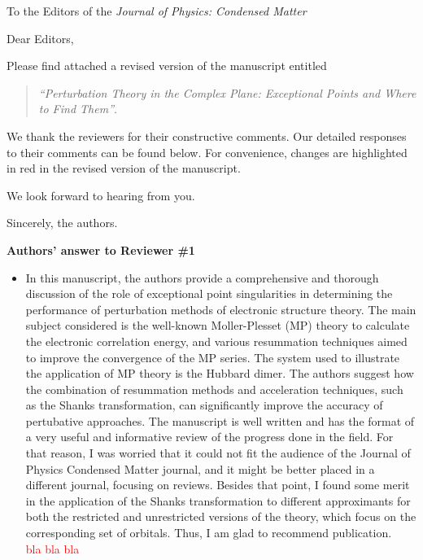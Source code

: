 \documentclass[10pt]{letter}
\newcommand{\alert}[1]{\textcolor{red}{#1}}
\begin{document}
\begin{letter}%
{To the Editors of the \textit{Journal of Physics: Condensed Matter}}

\opening{Dear Editors,}

\justifying
Please find attached a revised version of the manuscript entitled 
\begin{quote}
	\textit{``Perturbation Theory in the Complex Plane: Exceptional Points and Where to Find Them''}.
\end{quote}
We thank the reviewers for their constructive comments.
Our detailed responses to their comments can be found below.
For convenience, changes are highlighted in red in the revised version of the manuscript. 

We look forward to hearing from you.

\closing{Sincerely, the authors.}

\noindent \textbf{\large Authors' answer to Reviewer \#1}

\begin{itemize}

	\item 
	{In this manuscript, the authors provide a comprehensive and thorough discussion of the role of exceptional point singularities in determining the performance of perturbation methods of electronic structure theory. The main subject  considered is the well-known Moller-Plesset (MP) theory to calculate the electronic correlation energy, and various resummation techniques aimed to improve the convergence of the MP series. The system used to illustrate the application of MP theory is the Hubbard dimer. The authors suggest how the combination of resummation methods and acceleration techniques, such as the Shanks transformation, can significantly improve the accuracy of pertubative approaches. The manuscript is well written and has the format of a very useful and informative review of the progress done in the field. For that reason, I was worried that it could not fit the audience of the Journal of Physics Condensed Matter journal, and it might be better placed in a different journal, focusing on reviews. Besides that point, I found some merit in the application of the Shanks transformation to different approximants for both the restricted and unrestricted versions of the theory, which focus on the corresponding set of orbitals. Thus, I am glad to recommend publication.}
	\\
	\alert{bla bla bla}
	
\end{itemize}


\end{letter}
\end{document}
